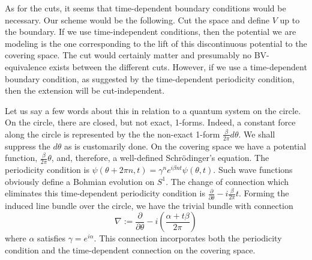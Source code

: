 \documentclass[11pt]{article}
\theoremstyle{remark}
\begin{document}
As for the cuts, it seems that time-dependent boundary conditions
would be necessary. Our scheme would be the following. Cut the space
and define $V$ up to the boundary.
If we use time-independent conditions,
then the potential we are modeling is the one corresponding to the
lift of this discontinuous potential to the covering space. The cut
would certainly matter and  presumably no 
BV-equivalence exists between the different cuts. 
However, if we use a time-dependent
boundary condition, as suggested by the time-dependent periodicity condition,
then the extension will be cut-independent.


Let us say a few words about this in relation to a quantum system on
the circle. 
On the circle, there are closed, but not
exact, 1-forms. 
Indeed, a constant force along
the circle is represented by the the non-exact 1-form
$\frac{\beta}{2\pi}d\theta $. We shall suppress the $d\theta$ as is
customarily done.   
On the covering space we
have a potential function, $\frac{\beta}{2\pi} \theta$,  and, therefore, a
well-defined Schr\"odinger's equation.  The
  periodicity condition is $\ensuremath{\psi} (\theta +2\pi n, t) = \gamma^n e^{i
\beta n t} \ensuremath{\psi}(\theta, t)$. 
Such wave functions obviously define a Bohmian evolution on $S^1$.
The change of connection which eliminates this time-dependent
periodicity condition is $\ensuremath{\frac{\partial {}}{\partial {\theta}}} - i \frac{\beta}{2 \pi}
t$. Forming the induced line bundle over the circle, we have the
trivial bundle with 
 connection 
\begin{equation*} 
\nabla \ensuremath{:=} \ensuremath{\frac{\partial {}}{\partial {\theta}}} - i ( \frac{\alpha + t \beta}{2 \pi} )
\end{equation*}
 where $\alpha$
satisfies $\gamma = e^{i \alpha}$. This connection incorporates both the
periodicity condition and the time-dependent connection on the
covering space.

\clearpage


\end{document}
